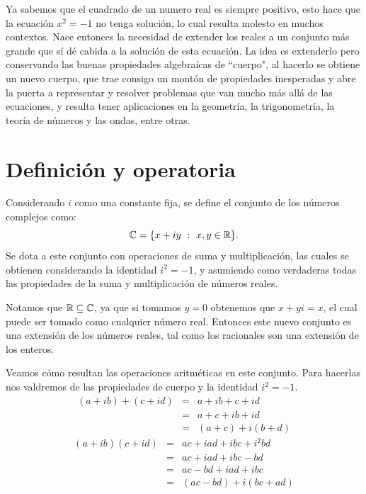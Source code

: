 
Ya sabemos que el cuadrado de un numero real es siempre positivo, esto hace que la ecuación $x^2=-1$ no tenga solución, lo cual resulta molesto en muchos contextos. Nace entonces la necesidad de extender los reales a un conjunto más grande que sí dé cabida a la solución de esta ecuación.
La idea es extenderlo pero conservando las buenas propiedades algebraícas de ``cuerpo", al hacerlo se obtiene un nuevo cuerpo, que trae consigo un montón de propiedades inesperadas y abre la puerta a representar y resolver problemas que van mucho más allá de las ecuaciones, y resulta tener aplicaciones en la geometría, la trigonometría, la teoría de números y las ondas, entre otras.

\section{Definición y operatoria}

\begin{defn}
Considerando $i$ como una constante fija, se define el conjunto de los números complejos como:
\begin{equation}\label{ec0}
    \mathbb{C}=\{x+iy\ :\  x,y\in\mathbb{R}\}.
\end{equation} 
Se dota a este conjunto con operaciones de suma y multiplicación, las cuales se obtienen considerando la identidad $i^2=-1$, y asumiendo como verdaderas todas las propiedades de la suma y multiplicación de números reales.
\end{defn}

Notamos que $\mathbb{R}\subseteq\mathbb{C}$, ya que si tomamos $y=0$ obtenemos que $x+y i=x$, el cual puede ser tomado como cualquier número real.
Entonces este nuevo conjunto es una extensión de los números reales, tal como los racionales son una extensión de los enteros. 

Veamos cómo resultan las operaciones aritméticas en este conjunto. 
Para hacerlas nos valdremos de las propiedades de cuerpo y la identidad $i^2=-1$.
\begin{eqnarray*}
        (a+ib)+(c+id)&=&a+ib +c+id\\
        &=&a+c+ib +id\\
        &=&(a+c)+i(b+d)\label{ec1}
\end{eqnarray*}   
\begin{eqnarray*}
        (a+ib )(c+id)&=&a c+ia d+ib c+i^2b d\\
        &=&a c+ia d+ib c-b d\\
        &=&a c-b d+ia d+ib c\\
        &=&(a c-b d)+i(b c+a d)\label{ec2}
\end{eqnarray*}   

